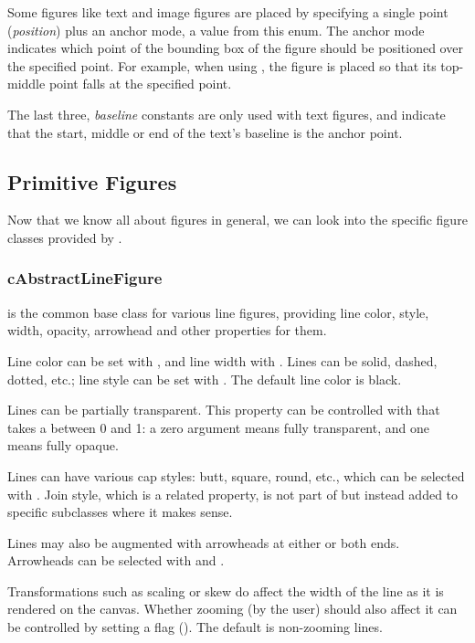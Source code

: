 Some figures like text and image figures are placed by specifying a single
point (\textit{position}) plus an anchor mode, a value from this enum. The
anchor mode indicates which point of the bounding box of the figure should
be positioned over the specified point. For example, when using
, the figure is placed so that its top-middle point falls at
the specified point.

The last three, \textit{baseline} constants are only used with text
figures, and indicate that the start, middle or end of the text's baseline
is the anchor point.


\subsection{Primitive Figures}

Now that we know all about figures in general, we can look into the
specific figure classes provided by {\opp}.

\subsubsection{cAbstractLineFigure}

 is the common base class for various line
figures, providing line color, style, width, opacity, arrowhead and other
properties for them.

Line color can be set with , and line width with
. Lines can be solid, dashed, dotted, etc.; line
style can be set with . The default line color is
black.

Lines can be partially transparent. This property can be controlled with
 that takes a  between 0 and 1: a zero
argument means fully transparent, and one means fully opaque.

Lines can have various cap styles: butt, square, round, etc., which can be
selected with . Join style, which is a related
property, is not part of  but instead added to
specific subclasses where it makes sense.

Lines may also be augmented with arrowheads at either or both ends.
Arrowheads can be selected with  and
.

Transformations such as scaling or skew do affect the width of the line as it
is rendered on the canvas. Whether zooming (by the user) should also affect
it can be controlled by setting a flag ().
The default is non-zooming lines.

